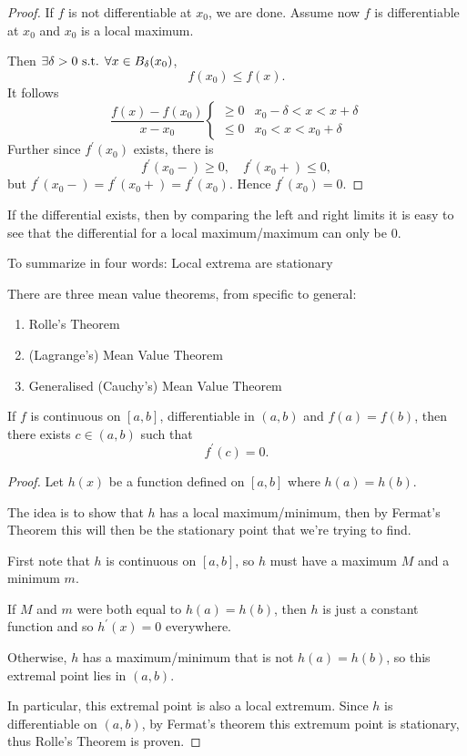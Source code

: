 \begin{proof}
If $f$ is not differentiable at $x_0$, we are done. Assume now $f$ is differentiable at $x_0$ and $x_0$ is a local maximum.

Then $\exists\delta>0\text{ s.t. }\forall x\in B_\delta(x_0)$,
\[ f(x_0)\le f(x). \]
It follows
\[ \frac{f(x)-f(x_0)}{x-x_0}\begin{cases}
\ge0 & x_0-\delta<x<x+\delta\\
\le0 & x_0<x<x_0+\delta
\end{cases} \]
Further since $f^\prime(x_0)$ exists, there is
\[ f^\prime(x_0-)\ge0, \quad f^\prime(x_0+)\le0, \]
but $f^\prime(x_0-)=f^\prime(x_0+)=f^\prime(x_0)$. Hence $f^\prime(x_0)=0.$
\end{proof}


\begin{theorem}
If the differential exists, then by comparing the left and right limits it is easy to see that the differential for a local maximum/maximum can only be $0$.

To summarize in four words: Local extrema are stationary
\end{theorem}

There are three mean value theorems, from specific to general:
\begin{enumerate}
\item Rolle's Theorem
\item (Lagrange's) Mean Value Theorem
\item Generalised (Cauchy's) Mean Value Theorem
\end{enumerate}

\begin{theorem}
If $f$ is continuous on $[a,b]$, differentiable in $(a,b)$ and $f(a)=f(b)$, then there exists $c\in(a,b)$ such that 
\[ f^\prime(c)=0. \]
\end{theorem}

\begin{proof}
Let $h(x)$ be a function defined on $[a,b]$ where $h(a)=h(b)$.

The idea is to show that $h$ has a local maximum/minimum, then by Fermat's Theorem this will then be the stationary point that we're trying to find.

First note that $h$ is continuous on $[a,b]$, so $h$ must have a maximum $M$ and a minimum $m$.

If $M$ and $m$ were both equal to $h(a)=h(b)$, then $h$ is just a constant function and so $h^\prime(x)=0$ everywhere.

Otherwise, $h$ has a maximum/minimum that is not $h(a)=h(b)$, so this extremal point lies in $(a,b)$.

In particular, this extremal point is also a local extremum.
Since $h$ is differentiable on $(a,b)$, by Fermat's theorem this extremum point is stationary, thus Rolle's Theorem is proven.
\end{proof}

